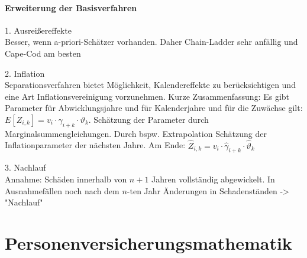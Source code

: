 \documentclass[12pt]{report}
\theoremstyle{dotless}
\theoremstyle{definition}
\begin{document}
\newpage
\subsubsection{Erweiterung der Basisverfahren}
1. Ausreißereffekte \\
Besser, wenn a-priori-Schätzer vorhanden. Daher Chain-Ladder sehr anfällig und Cape-Cod am besten

2. Inflation\\
Separationsverfahren bietet Möglichkeit, Kalendereffekte zu berücksichtigen und eine Art Inflationsvereinigung vorzunehmen. Kurze Zusammenfassung: Es gibt Parameter für Abwicklungsjahre und für Kalenderjahre und für die Zuwächse gilt: $E[Z_{i,k}]=v_i\cdot \gamma_{i+k}\cdot \vartheta_k$. Schätzung der Parameter durch Marginalsummengleichungen. Durch bspw. Extrapolation Schätzung der Inflationparameter der nächsten Jahre. Am Ende: $\hat{Z}_{i,k}= v_i \cdot \hat{\gamma}_{i+k} \cdot \hat{\vartheta}_k$ 

3. Nachlauf\\
Annahme: Schäden innerhalb von $n+1$ Jahren vollständig abgewickelt. In Ausnahmefällen noch nach dem $n$-ten Jahr Änderungen in Schadenständen -> "Nachlauf" 

















\chapter{Personenversicherungsmathematik}
\end{document}
